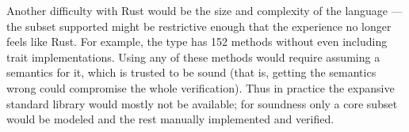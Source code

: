 Another difficulty with Rust would be the size and complexity of the language
--- the subset supported might be restrictive enough that the experience no
longer feels like Rust. For example, the  type has 152 methods
without even including trait implementations. Using any of these methods would
require assuming a semantics for it, which is trusted to be sound (that is,
getting the semantics wrong could compromise the whole verification). Thus in
practice the expansive standard library would mostly not be available; for
soundness only a core subset would be modeled and the rest manually implemented
and verified.
